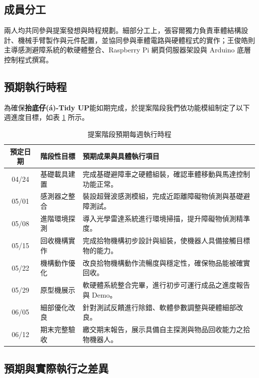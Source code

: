 \documentclass[12pt]{article}
\begin{document}
\subsection{成員分工}

兩人均共同參與提案發想與時程規劃。細部分工上，張容爾獨力負責車體結構設計、機械手臂製作與元件配置，並協同參與車體電路與硬體程式的實作；王俊皓則主導感測避障系統的軟硬體整合、Raspberry Pi 網頁伺服器架設與 Arduino 底層控制程式撰寫。

\subsection{預期執行時程}

為確保\textbf{抬底仔(á)-Tidy UP}能如期完成，於提案階段我們依功能模組制定了以下週進度目標，如表 \ref{tab:schedule} 所示。

\begin{table}[H]
    \centering
    \caption{提案階段預期每週執行時程}
    \label{tab:schedule}
    \renewcommand{\arraystretch}{1.4}
    \begin{tabularx}{\textwidth}{c |l| X}
        \toprule
        \textbf{預定日期} & \textbf{階段性目標} & \textbf{預期成果與具體執行項目} \\
        \midrule
        04/24 & 基礎載具建置 & 完成基礎避障車之硬體組裝，確認車體移動與馬達控制功能正常。 \\
        05/01 & 感測器之整合 & 裝設超聲波感測模組，完成近距離障礙物偵測與基礎避障測試。 \\
        05/08 & 進階環境探測 & 導入光學雷達系統進行環境掃描，提升障礙物偵測精準度。 \\
        05/15 & 回收機構實作 & 完成拾物機構初步設計與組裝，使機器人具備接觸目標物的能力。 \\
        05/22 & 機構動作優化 & 改良拾物機構動作流暢度與穩定性，確保物品能被確實回收。 \\
        05/29 & 原型機展示 & 軟硬體系統整合完畢，進行初步可運行成品之進度報告與 Demo。 \\
        06/05 & 細部優化改良 & 針對測試反饋進行除錯、軟體參數調整與硬體細部改良。 \\
        06/12 & 期末完整驗收 & 繳交期末報告，展示具備自主探測與物品回收能力之拾物機器人。 \\
        \bottomrule
    \end{tabularx}
\end{table}

\subsection{預期與實際執行之差異}
\end{document}
